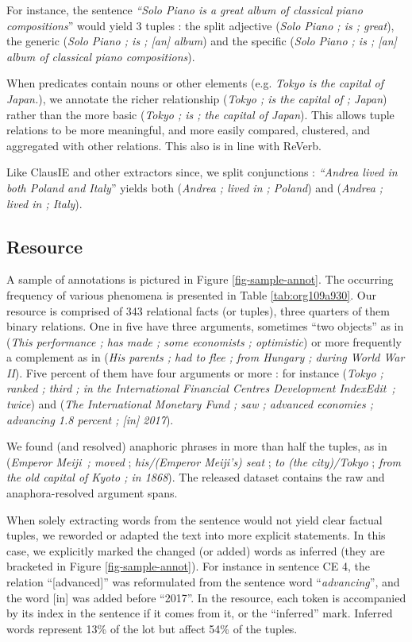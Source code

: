 \pdfoutput=1 \documentclass[11pt, a4paper]{article}
\begin{document}
For instance, the sentence \emph{``Solo Piano is a great album of classical piano
compositions}'' would yield 3 tuples : the split adjective (\emph{Solo Piano ; is
; great}), the generic (\emph{Solo Piano ; is ; [an] album}) and the specific
(\emph{Solo Piano ; is ; [an] album of classical piano compositions}).

When predicates contain nouns or other elements (e.g. \emph{Tokyo is the
capital of Japan.}), we annotate the richer relationship (\emph{Tokyo ; is the
capital of ; Japan}) rather than the more basic (\emph{Tokyo ; is ; the capital
of Japan}). This allows tuple relations to be more meaningful, and more
easily compared, clustered, and aggregated with other relations. This also
is in line with ReVerb.

Like ClausIE and other extractors since, we split conjunctions : \emph{``Andrea
lived in both Poland and Italy}'' yields both (\emph{Andrea ; lived in ;
Poland}) and (\emph{Andrea ; lived in ; Italy}).

\subsection{Resource}
\label{sec:org2c01bf4}

A sample of annotations is pictured in Figure \ref{fig-sample-annot}. The
occurring frequency of various phenomena is presented in Table \ref{tab:org109a930}.
Our resource is comprised of 343 relational facts (or tuples), three quarters of them
binary relations. One in five have three arguments, sometimes ``two objects'' as
in (\emph{This performance ; has made ; some economists ; optimistic}) or more
frequently a complement as in (\emph{His parents ; had to flee ; from Hungary ;
during World War II}). Five percent of them have four arguments or more : for
instance (\emph{Tokyo ; ranked ; third ; in the International Financial Centres
Development IndexEdit~; twice}) and (\emph{The International Monetary Fund ; saw ;
advanced economies ; advancing 1.8 percent ; [in] 2017}).

We found (and resolved) anaphoric phrases in more than half the
tuples, as in (\emph{Emperor Meiji~; moved} ; \emph{his/(Emperor Meiji's) seat} ; \emph{to
(the city)/Tokyo} ; \emph{from the old capital of Kyoto ; in 1868}). The released
dataset contains the raw and anaphora-resolved argument spans.

When solely extracting words from the sentence would not yield clear factual
tuples, we reworded or adapted the text into more explicit statements. In this
case, we explicitly marked the changed (or added) words as inferred (they are bracketed in Figure
\ref{fig-sample-annot}). For instance in sentence CE 4, the relation ``[advanced]'' was reformulated from the sentence word
``\textit{advancing}'', and the word [in] was added before ``2017''. In the resource, each token is
accompanied by its index in the sentence if it comes from it, or the ``inferred''
mark. Inferred words represent 13\% of the lot but affect 54\% of the tuples.
\end{document}
